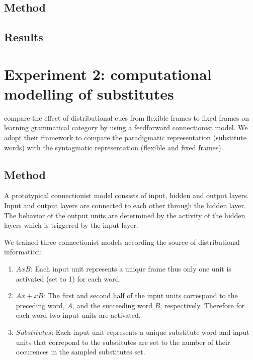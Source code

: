 \subsection{Method}
\subsection{Results}

\section{Experiment 2: computational modelling of substitutes}

\cite{20674613} compare the effect of distributional cues from
flexible frames to fixed frames on learning grammatical category by
using a feedforward connectionist model.  We adopt their framework to
compare the paradigmatic representation (substitute words) with the
syntagmatic representation (flexible and fixed frames).

\subsection{Method}
A prototypical connectionist model consists of input, hidden and
output layers.  Input and output layers are connected to each other
through the hidden layer.  The behavior of the output units are
determined by the activity of the hidden layers which is triggered by
the input layer.

We trained three connectionist models according the source of
distributional information:
\begin{enumerate}
\item $AxB$: Each input unit represents a unique frame thus only one
  unit is activated (set to 1) for each word.

\item $Ax + xB$: The first and second half of the input units
  correspond to the preceding word, $A$, and the succeeding word $B$,
  respectively.  Therefore for each word two input units are
  activated.

\item $Substitutes$: Each input unit represents a unique substitute
  word and input units that correpond to the substitutes are set to
  the number of their occurences in the sampled substitutes set.
    
\end{enumerate}

